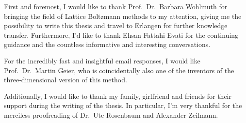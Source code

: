 
First and foremost, I would like to thank Prof.\ Dr.\ Barbara Wohlmuth for bringing the field of Lattice Boltzmann methods to my attention, giving me the possibility to write this thesis and travel to Erlangen for further knowledge transfer.
Furthermore, I'd like to thank Ehsan Fattahi Evati for the continuing guidance and the countless informative and interesting conversations.

For the incredibly fast and insightful email responses, I would like Prof.\ Dr.\ Martin Geier, who is coincidentally also one of the inventors of the three-dimensional version of this method.

Additionally, I would like to thank my family, girlfriend and friends for their support during the writing of the thesis.
In particular, I'm very thankful for the merciless proofreading of Dr.\ Ute Rosenbaum and Alexander Zeilmann.
